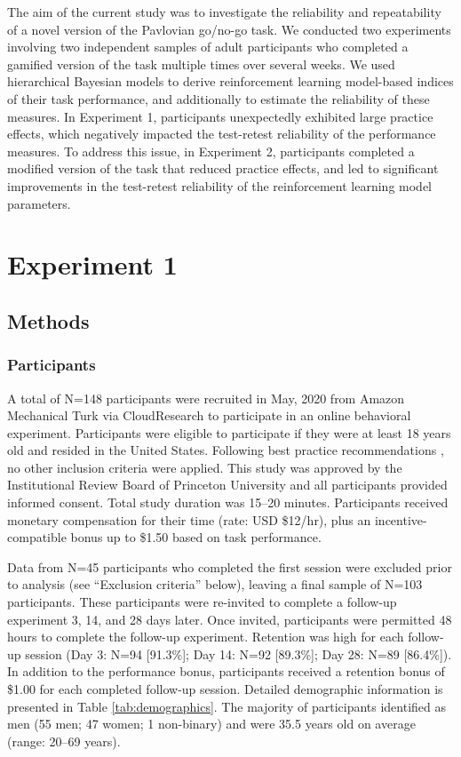 \documentclass[a4paper,12pt]{article}
\begin{document}
\begin{refsection}[main]
The aim of the current study was to investigate the reliability and repeatability of a novel version of the Pavlovian go/no-go task. We conducted two experiments involving two independent samples of adult participants who completed a gamified version of the task multiple times over several weeks. We used hierarchical Bayesian models to derive reinforcement learning model-based indices of their task performance, and additionally to estimate the reliability of these measures. In Experiment 1, participants unexpectedly exhibited large practice effects, which negatively impacted the test-retest reliability of the performance measures. To address this issue, in Experiment 2, participants completed a modified version of the task that reduced practice effects, and led to significant improvements in the test-retest reliability of the reinforcement learning model parameters.

\section*{Experiment 1}

\subsection*{Methods}

\subsubsection*{Participants}

A total of N=148 participants were recruited in May, 2020 from Amazon Mechanical Turk via CloudResearch \cite{litman2017turkprime} to participate in an online behavioral experiment. Participants were eligible to participate if they were at least 18 years old and resided in the United States. Following best practice recommendations \cite{robinson2019tapped}, no other inclusion criteria were applied. This study was approved by the Institutional Review Board of Princeton University and all participants provided informed consent. Total study duration was 15--20 minutes. Participants received monetary compensation for their time (rate: USD \$12/hr), plus an incentive-compatible bonus up to \$1.50 based on task performance. 

Data from N=45 participants who completed the first session were excluded prior to analysis (see ``Exclusion criteria'' below), leaving a final sample of N=103 participants. These participants were re-invited to complete a follow-up experiment 3, 14, and 28 days later. Once invited, participants were permitted 48 hours to complete the follow-up experiment. Retention was high for each follow-up session (Day 3: N=94 [91.3\%]; Day 14: N=92 [89.3\%]; Day 28: N=89 [86.4\%]). In addition to the performance bonus, participants received a retention bonus of \$1.00 for each completed follow-up session. Detailed demographic information is presented in Table \ref{tab:demographics}. The majority of participants identified as men (55 men; 47 women; 1 non-binary) and were 35.5 years old on average (range: 20--69 years).


\end{refsection}
\end{document}
